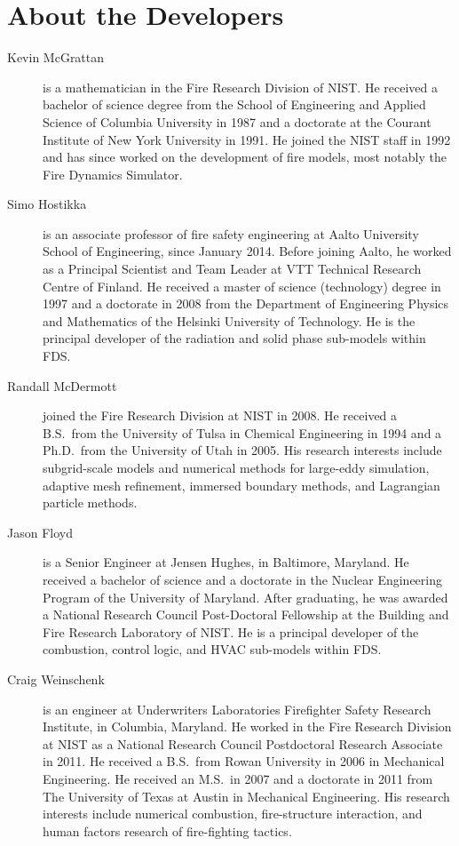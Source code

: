 \chapter{About the Developers}

\begin{description}

\item[Kevin McGrattan] is a mathematician in the Fire Research Division of NIST. He received a bachelor of science degree from the School of Engineering and Applied Science of Columbia University in 1987 and a doctorate at the Courant Institute of New York University in 1991. He joined the NIST staff in 1992 and has since worked on the development of fire models, most notably the Fire Dynamics Simulator.

\item[Simo Hostikka] is an associate professor of fire safety engineering at Aalto University School of Engineering, since January 2014. Before joining Aalto, he worked as a Principal Scientist and Team Leader at VTT Technical Research Centre of Finland. He received a master of science (technology) degree in 1997 and a doctorate in 2008 from the Department of Engineering Physics and Mathematics of the Helsinki University of Technology.  He is the principal developer of the radiation and solid phase sub-models within FDS.

\item[Randall McDermott] joined the Fire Research Division at NIST in 2008. He received a B.S.~from the University of Tulsa in Chemical Engineering in 1994 and a Ph.D.~from the University of Utah in 2005. His research interests include subgrid-scale models and numerical methods for large-eddy simulation, adaptive mesh refinement, immersed boundary methods, and Lagrangian particle methods.

\item[Jason Floyd] is a Senior Engineer at Jensen Hughes, in Baltimore, Maryland. He received a bachelor of science and a doctorate in the Nuclear Engineering Program of the University of Maryland. After graduating, he was awarded a National Research Council Post-Doctoral Fellowship at the Building and Fire Research Laboratory of NIST. He is a principal developer of the combustion, control logic, and HVAC sub-models within FDS.

\item[Craig Weinschenk] is an engineer at Underwriters Laboratories Firefighter Safety Research Institute, in Columbia, Maryland. He worked in the Fire Research Division at NIST as a National Research Council Postdoctoral Research Associate in 2011. He received a B.S.~from Rowan University in 2006 in Mechanical Engineering. He received an M.S.~in 2007 and a doctorate in 2011 from The University of Texas at Austin in Mechanical Engineering. His research interests include numerical combustion, fire-structure interaction, and human factors research of fire-fighting tactics.


\end{description}
